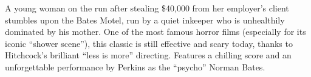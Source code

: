 \iffalse
\movie{Pride \& Prejudice}{2005}{127m}{\threehalf} \dir{Joe Wright} \cast{Keira Knightley; Donald Sutherland; Brenda Blethyn; Rosamund Pike; Jena Malone; Carey Mulligan; Matthew Macfadyen; Tom Hollander; Judi Dench}
\fi

   A young woman on the run after stealing \$40,000 from her employer's client stumbles upon the Bates Motel, run by a quiet inkeeper who is unhealthily dominated by his mother. One of the most famous horror films (especially for its iconic ``shower scene''), this classic is still effective and scary today, thanks to Hitchcock's brilliant ``less is more'' directing. Features a chilling score and an unforgettable performance by Perkins as the ``psycho'' Norman Bates. \author{DW} 
